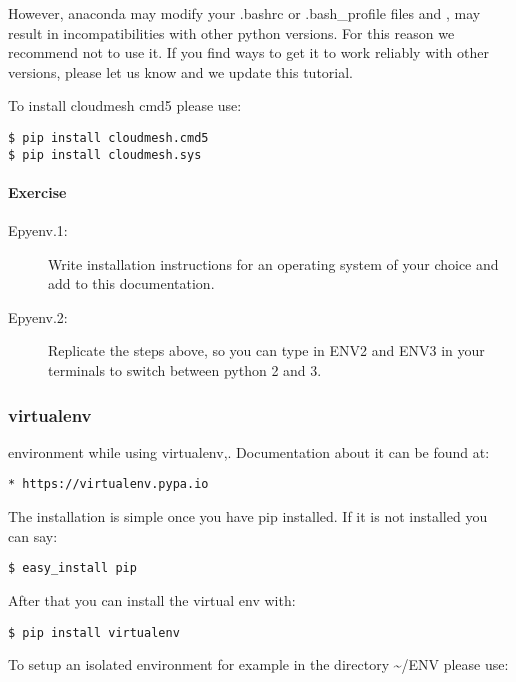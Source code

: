 However, anaconda may modify your .bashrc or .bash\_profile files and ,
may result in incompatibilities with other python versions. For this
reason we recommend not to use it. If you find ways to get it to work
reliably with other versions, please let us know and we update this
tutorial.

To install cloudmesh cmd5 please use:

\begin{verbatim}
$ pip install cloudmesh.cmd5
$ pip install cloudmesh.sys
\end{verbatim}

\paragraph{Exercise}\label{exercise}

\begin{description}
\item[Epyenv.1:]
Write installation instructions for an operating system of your choice
and add to this documentation.
\item[Epyenv.2:]
Replicate the steps above, so you can type in ENV2 and ENV3 in your
terminals to switch between python 2 and 3.
\end{description}

\subsubsection{virtualenv}\label{virtualenv}

environment while using virtualenv,. Documentation about it can be found
at:

\begin{verbatim}
* https://virtualenv.pypa.io
\end{verbatim}

The installation is simple once you have pip installed. If it is not
installed you can say:

\begin{verbatim}
$ easy_install pip
\end{verbatim}

After that you can install the virtual env with:

\begin{verbatim}
$ pip install virtualenv
\end{verbatim}

To setup an isolated environment for example in the directory
\textasciitilde{}/ENV please use:

